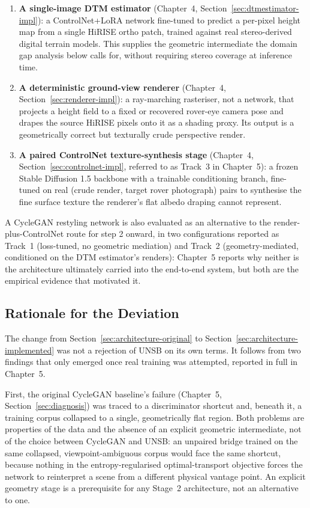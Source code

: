 \begin{enumerate}
  \item \textbf{A single-image DTM estimator} (Chapter~4, Section~\ref{sec:dtmestimator-impl}): a ControlNet+LoRA network fine-tuned to predict a per-pixel height map from a single HiRISE ortho patch, trained against real stereo-derived digital terrain models. This supplies the geometric intermediate the domain gap analysis below calls for, without requiring stereo coverage at inference time.
  \item \textbf{A deterministic ground-view renderer} (Chapter~4, Section~\ref{sec:renderer-impl}): a ray-marching rasteriser, not a network, that projects a height field to a fixed or recovered rover-eye camera pose and drapes the source HiRISE pixels onto it as a shading proxy. Its output is a geometrically correct but texturally crude perspective render.
  \item \textbf{A paired ControlNet texture-synthesis stage} (Chapter~4, Section~\ref{sec:controlnet-impl}, referred to as Track~3 in Chapter~5): a frozen Stable Diffusion 1.5 backbone with a trainable conditioning branch, fine-tuned on real (crude render, target rover photograph) pairs to synthesise the fine surface texture the renderer's flat albedo draping cannot represent.
\end{enumerate}

A CycleGAN restyling network is also evaluated as an alternative to the render-plus-ControlNet route for step 2 onward, in two configurations reported as Track~1 (loss-tuned, no geometric mediation) and Track~2 (geometry-mediated, conditioned on the DTM estimator's renders): Chapter~5 reports why neither is the architecture ultimately carried into the end-to-end system, but both are the empirical evidence that motivated it.

\subsection{Rationale for the Deviation}
\label{sec:deviation-rationale}

The change from Section~\ref{sec:architecture-original} to Section~\ref{sec:architecture-implemented} was not a rejection of UNSB on its own terms. It follows from two findings that only emerged once real training was attempted, reported in full in Chapter~5.

First, the original CycleGAN baseline's failure (Chapter~5, Section~\ref{sec:diagnosis}) was traced to a discriminator shortcut and, beneath it, a training corpus collapsed to a single, geometrically flat region. Both problems are properties of the data and the absence of an explicit geometric intermediate, not of the choice between CycleGAN and UNSB: an unpaired bridge trained on the same collapsed, viewpoint-ambiguous corpus would face the same shortcut, because nothing in the entropy-regularised optimal-transport objective forces the network to reinterpret a scene from a different physical vantage point. An explicit geometry stage is a prerequisite for any Stage~2 architecture, not an alternative to one.

